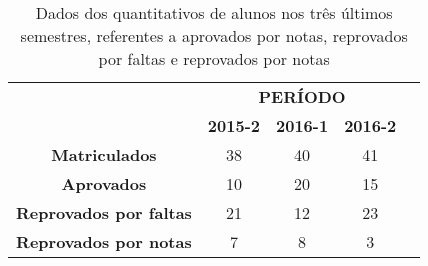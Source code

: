 \begin{table}[]
\centering

\begin{tabular}{|c|c|c|c|l}
\cline{1-4}
                                                       & \multicolumn{3}{c|}{\textbf{PERÍODO}}                                                &  \\ \cline{2-4}
\multirow{}{}{}                                     & \textbf{2015-2}            & \textbf{2016-1}            & \textbf{2016-2}            &  \\ \cline{1-4}
\textbf{Matriculados}                                  & 38                         & 40                         & 41                         &  \\ \cline{1-4}
\cellcolor[HTML]{67FD9A}\textbf{Aprovados}             & \cellcolor[HTML]{67FD9A}10 & \cellcolor[HTML]{67FD9A}20 & \cellcolor[HTML]{67FD9A}15 &  \\ \cline{1-4}
\cellcolor[HTML]{EFEFEF}\textbf{Reprovados por faltas} & \cellcolor[HTML]{EFEFEF}21 & \cellcolor[HTML]{EFEFEF}12 & \cellcolor[HTML]{EFEFEF}23 &  \\ \cline{1-4}
\cellcolor[HTML]{FD6864}\textbf{Reprovados por notas}  & \cellcolor[HTML]{FD6864}7  & \cellcolor[HTML]{FD6864}8  & \cellcolor[HTML]{FD6864}3  &  \\ \cline{1-4}
\end{tabular}
\caption{Dados dos quantitativos de alunos nos três últimos semestres, referentes a aprovados por notas, reprovados por faltas e reprovados por notas}
\label{dados_alunos_3_ultimos_semestres}
\end{table}